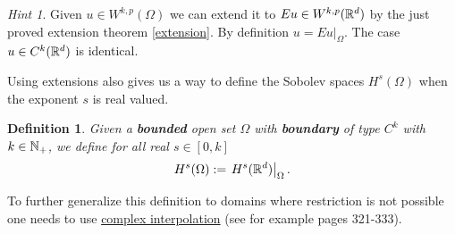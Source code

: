 \documentclass[12pt]{article}
\newtheorem{definition}{Definition}
\theoremstyle{remark}
\newtheorem*{hint}{Hint}
\newcommand\restr[2]{\left.#1\right|_{#2}}
\begin{document}
\begin{hint}
	Given $u \in W^{k,p}(\Omega)$ we can extend it to $Eu \in W^{k,p}(\mathbb{R}^d)$ by the just proved extension theorem \ref{extension}. By definition $u= \restr{Eu}{\Omega}$. The case $u \in C^k(\mathbb{R}^d)$ is identical.
\end{hint}
Using extensions also gives us a way to define the Sobolev spaces $H^s(\Omega)$ when the exponent $s$ is real valued.
\begin{definition}
	Given a \textbf{bounded} open set $\Omega$ with \textbf{boundary} of type $C^k$ with $k \in \mathbb{N}_+$, we define for all real $s \in [0,k]$
	\begin{align*}
		H^s(\Omega):=\restr{H^s(\R^d)}{\Omega} .
	\end{align*}
\end{definition}
To further generalize this definition to domains where restriction is not possible one needs to use \href{https://en.wikipedia.org/wiki/Interpolation_space}{complex interpolation} (see for example \cite{taylor2013partial} pages 321-333).
\end{document}
